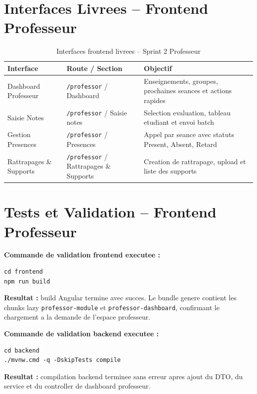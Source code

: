 \documentclass[12pt,a4paper]{report}
\begin{document}
\section{Interfaces Livrees -- Frontend Professeur}

\begin{table}[H]
\centering
\caption{Interfaces frontend livrees -- Sprint 2 Professeur}
\begin{tabular}{|p{4cm}|p{4cm}|p{5cm}|}
\hline
\textbf{Interface} & \textbf{Route / Section} & \textbf{Objectif} \\
\hline
Dashboard Professeur & \texttt{/professor} / Dashboard & Enseignements, groupes, prochaines seances et actions rapides \\
\hline
Saisie Notes & \texttt{/professor} / Saisie notes & Selection evaluation, tableau etudiant et envoi batch \\
\hline
Gestion Presences & \texttt{/professor} / Presences & Appel par seance avec statuts Present, Absent, Retard \\
\hline
Rattrapages \& Supports & \texttt{/professor} / Rattrapages \& Supports & Creation de rattrapage, upload et liste des supports \\
\hline
\end{tabular}
\end{table}

\section{Tests et Validation -- Frontend Professeur}

\textbf{Commande de validation frontend executee :}

\begin{verbatim}
cd frontend
npm run build
\end{verbatim}

\textbf{Resultat :} build Angular termine avec succes. Le bundle genere contient les chunks lazy \texttt{professor-module} et \texttt{professor-dashboard}, confirmant le chargement a la demande de l'espace professeur.

\textbf{Commande de validation backend executee :}

\begin{verbatim}
cd backend
./mvnw.cmd -q -DskipTests compile
\end{verbatim}

\textbf{Resultat :} compilation backend terminee sans erreur apres ajout du DTO, du service et du controller de dashboard professeur.
\end{document}
